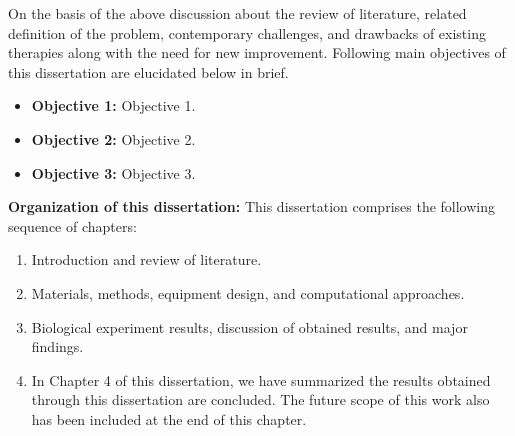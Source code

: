 \begin{refsection}
On the basis of the above discussion about the review of literature, related definition of the problem, contemporary challenges, and drawbacks of existing therapies along with the need for new improvement.
Following main objectives of this dissertation are elucidated below in brief.
\begin{itemize}
	\item \textbf{Objective 1:} Objective 1.
	\item \textbf{Objective 2:} Objective 2.
	\item \textbf{Objective 3:} Objective 3.
\end{itemize}

\textbf{Organization of this dissertation:} This dissertation comprises the following sequence of chapters:
\begin{enumerate}[label=\textbf{Chapter \arabic*:}]
	\item Introduction and review of literature.
	
	\item Materials, methods, equipment design, and computational approaches.
	
	\item Biological experiment results, discussion of obtained results, and major findings.
	
	\item In Chapter 4 of this dissertation, we have summarized the results obtained through this dissertation are
	concluded. The future scope of this work also has been included at the end of this chapter.
\end{enumerate}

\printbibliography
\end{refsection}